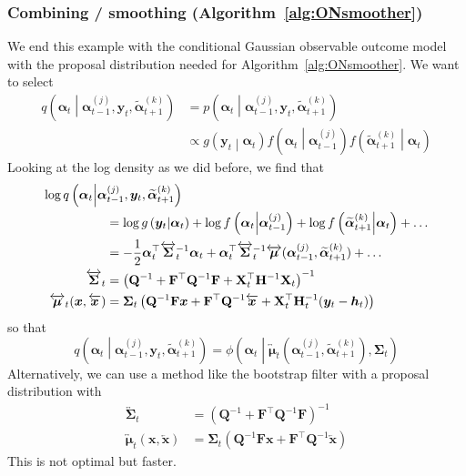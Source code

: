 \documentclass[notitlepage]{article}
\renewcommand{\vec}[1]{\bm{#1}}
\newcommand{\vecLarrow}[1]{\overleftarrow{\vec{#1}}}
\newcommand{\vecLRarrow}[1]{\overleftrightarrow{\vec{#1}}}
\newcommand{\mat}[1]{\mathbf{#1}}
\newcommand{\matLRarrow}[1]{\overleftrightarrow{\mat{#1}}}
\newcommand{\Lparen}[1]{\left( #1\right)}
\newcommand{\Cond}[2]{ #1 \middle\vert  #2}
\newcommand{\optor}[2]{#1\Lparen{#2}}
\newcommand{\optorC}[3]{\optor{#1}{\Cond{#2}{#3}}}
\newcommand{\pdensC}[2]{\optorC{p}{#1}{#2}}
\newcommand{\normaldC}[3]{\optorC{\phi}{#1}{#2,#3}}
\newcommand{\IDC}[2]{\optorC{q}{#1}{#2}}
\newcommand{\partic}[3]{#1_{#2}^{\Lparen{#3}}}
\newcommand{\particB}[3]{\widetilde{#1}_{#2}^{\Lparen{#3}}}
\begin{document}
\subsubsection*{Combining / smoothing (Algorithm~\ref{alg:ONsmoother})}
We end this example with the conditional Gaussian observable outcome model with the 
proposal distribution needed for Algorithm~\ref{alg:ONsmoother}. We want to select 
%
\begin{align*}
\IDC{\vec\alpha_t}{\partic{\vec{\alpha}}{t-1}{j},\vec{y}_t, \particB{\vec{\alpha}}{t+1}{k}} &=
		\pdensC{\vec{\alpha}_t}{\partic{\vec{\alpha}}{t-1}{j},\vec{y}_t, \particB{\vec{\alpha}}{t+1}{k}} \\
&\propto \optorC{g}{\vec{y}_t}{\vec\alpha_t}
		\optorC{f}{\vec{\alpha}_t}{\partic{\vec{\alpha}}{t-1}{j}}
		\optorC{f}{\particB{\vec{\alpha}}{t+1}{k}}{\vec{\alpha}_t}
\end{align*}
%
Looking at the log density as we did before, we find that %
%
\begin{align}
\log\IDC{\vec\alpha_t}{\partic{\vec{\alpha}}{t-1} j,\vec y_t,
 \particB{\vec{\alpha}}{t+1}k} 
	\hspace{-60pt}& \nonumber\\
&=\log\optorC{g}{\vec{y}_t}{\vec\alpha_t}
	+ \log\optorC{f}{\vec{\alpha}_t}{\partic{\vec{\alpha}}{t-1}{j}}
	+ \log\optorC{f}{\particB{\vec{\alpha}}{t+1}{k}}{\vec{\alpha}_t} 		
	+ \dots \nonumber\\
& = - \frac 12 \vec\alpha_t^\top \matLRarrow\Sigma^{-1}_t\vec\alpha_t
		+ \vec\alpha_t^\top \matLRarrow\Sigma_t^{-1}\vecLRarrow\mu(
			\partic{\vec{\alpha}}{t-1} j,
			\particB{\vec\alpha}{t + 1}k) + \dots \nonumber\\
\matLRarrow\Sigma_t &= \Lparen{\mat Q^{-1} + \mat F^\top\mat Q^{-1}\mat F + 
		\mat X_t^\top \mat H^{-1} \mat X_t}^{-1} \label{eq:normalSmoothPropCov}\\
\vecLRarrow\mu_t(\vec x, \vecLarrow x) &= \mat\Sigma_t\Lparen{
	\mat Q^{-1}\mat F\vec x + \mat F^\top \mat Q^{-1}\vecLarrow x + 
	\mat X_t^\top\mat H_t^{-1}(\vec y_t - \vec h_t)} \label{eq:normalSmoothPropMean}
\end{align}%
% 
so that
%
$$
\IDC{\vec\alpha_t}{\partic{\vec{\alpha}}{t-1} j,\vec y_t,
 \particB{\vec{\alpha}}{t+1}k} = 
 	\normaldC{\vec\alpha_t}{
		\vecLRarrow\mu_t(\partic{\vec{\alpha}}{t-1} j, 
			\particB{\vec{\alpha}}{t + 1}k)}{\mat\Sigma_t}
$$
%
Alternatively, we can use a method like the bootstrap filter with a proposal distribution with%
% 
\begin{equation}\label{eq:bootSM}\begin{split}
\matLRarrow\Sigma_t &= \Lparen{\mat Q^{-1} + \mat F^\top\mat Q^{-1}\mat F}^{-1} \\
\vecLRarrow\mu_t(\vec x, \vecLarrow x) &= \mat\Sigma_t\Lparen{
	\mat Q^{-1}\mat F\vec x + \mat F^\top \mat Q^{-1}\vecLarrow x}
\end{split}\end{equation}%
% 
This is not optimal but faster.
\end{document}
